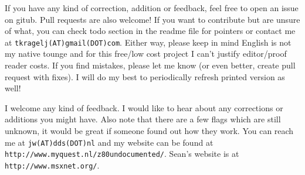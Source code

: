 \documentclass[twoside,openright,a4paper]{book}
\begin{document}
\begin{description}[style=unboxed,leftmargin=0cm]

	\item[Tomaz]\hfill

	If you have any kind of correction, addition or feedback, feel free to open an issue on gitub. Pull requests are also welcome! If you want to contribute but are unsure of what, you can check todo section in the readme file for pointers or contact me at {\tt tkragelj(AT)gmail(DOT)com}. Either way, please keep in mind English is not my native tounge and for this free/low cost project I can't justify editor/proof reader costs. If you find mistakes, please let me know (or even better, create pull request with fixes). I will do my best to periodically refresh printed version as well!

	\item[Jan]\hfill
	
	I welcome any kind of feedback. I would like to hear about any corrections or additions you might have. Also note that there are a few flags which are still unknown, it would be great if someone found out how they work. You can reach me at {\tt jw(AT)dds(DOT)nl} and my website can be found at {\tt http://www.myquest.nl/z80undocumented/}. Sean's website is at {\tt http://www.msxnet.org/}.

\end{description}


\pagebreak
\end{document}
